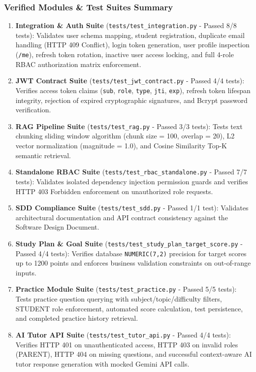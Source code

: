 \documentclass[12pt,a4paper]{article}
\begin{document}
\subsubsection*{Verified Modules \& Test Suites Summary}
\begin{enumerate}[leftmargin=1.5em, itemsep=0.2em]
    \item \textbf{Integration \& Auth Suite} (\texttt{tests/test\_integration.py} - Passed 8/8 tests): Validates user schema mapping, student registration, duplicate email handling (HTTP 409 Conflict), login token generation, user profile inspection (\texttt{/me}), refresh token rotation, inactive user access locking, and full 4-role RBAC authorization matrix enforcement.
    \item \textbf{JWT Contract Suite} (\texttt{tests/test\_jwt\_contract.py} - Passed 4/4 tests): Verifies access token claims (\texttt{sub}, \texttt{role}, \texttt{type}, \texttt{jti}, \texttt{exp}), refresh token lifespan integrity, rejection of expired cryptographic signatures, and Bcrypt password verification.
    \item \textbf{RAG Pipeline Suite} (\texttt{tests/test\_rag.py} - Passed 3/3 tests): Tests text chunking sliding window algorithm (chunk size = 100, overlap = 20), L2 vector normalization (magnitude = 1.0), and Cosine Similarity Top-K semantic retrieval.
    \item \textbf{Standalone RBAC Suite} (\texttt{tests/test\_rbac\_standalone.py} - Passed 7/7 tests): Validates isolated dependency injection permission guards and verifies HTTP 403 Forbidden enforcement on unauthorized role requests.
    \item \textbf{SDD Compliance Suite} (\texttt{tests/test\_sdd.py} - Passed 1/1 test): Validates architectural documentation and API contract consistency against the Software Design Document.
    \item \textbf{Study Plan \& Goal Suite} (\texttt{tests/test\_study\_plan\_target\_score.py} - Passed 4/4 tests): Verifies database \texttt{NUMERIC(7,2)} precision for target scores up to 1200 points and enforces business validation constraints on out-of-range inputs.
    \item \textbf{Practice Module Suite} (\texttt{tests/test\_practice.py} - Passed 5/5 tests): Tests practice question querying with subject/topic/difficulty filters, STUDENT role enforcement, automated score calculation, test persistence, and completed practice history retrieval.
    \item \textbf{AI Tutor API Suite} (\texttt{tests/test\_tutor\_api.py} - Passed 4/4 tests): Verifies HTTP 401 on unauthenticated access, HTTP 403 on invalid roles (PARENT), HTTP 404 on missing questions, and successful context-aware AI tutor response generation with mocked Gemini API calls.

\end{enumerate}
\end{document}
